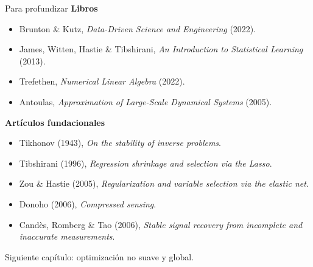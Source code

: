 \documentclass[10pt,aspectratio=169]{beamer}
\begin{document}
\begin{frame}{Para profundizar}
  \small
  \textbf{Libros}
  \begin{itemize}
    \item Brunton \& Kutz, \emph{Data-Driven Science and Engineering} (2022).
    \item James, Witten, Hastie \& Tibshirani, \emph{An Introduction to
      Statistical Learning} (2013).
    \item Trefethen, \emph{Numerical Linear Algebra} (2022).
    \item Antoulas, \emph{Approximation of Large-Scale Dynamical Systems}
      (2005).
  \end{itemize}

  \textbf{Artículos fundacionales}
  \begin{itemize}
    \item Tikhonov (1943), \emph{On the stability of inverse problems}.
    \item Tibshirani (1996), \emph{Regression shrinkage and selection via the
      Lasso}.
    \item Zou \& Hastie (2005), \emph{Regularization and variable selection via
      the elastic net}.
    \item Donoho (2006), \emph{Compressed sensing}.
    \item Cand\`es, Romberg \& Tao (2006), \emph{Stable signal recovery from
      incomplete and inaccurate measurements}.
  \end{itemize}

  \vfill
  \centering
  {\footnotesize\color{gray}
    Siguiente capítulo: optimización no suave y global.}
\end{frame}

\end{document}
